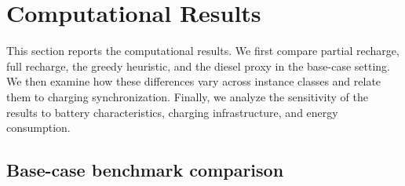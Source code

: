 \documentclass[3p,11pt,authoryear]{elsarticle}  %
\begin{document}










\section{Computational Results} \label{sec:Computational Results}

This section reports the computational results. We first compare partial recharge, full recharge, the greedy heuristic, and the diesel proxy in the base-case setting. We then examine how these differences vary across instance classes and relate them to charging synchronization. Finally, we analyze the sensitivity of the results to battery characteristics, charging infrastructure, and energy consumption.

\subsection{Base-case benchmark comparison}
\end{document}
